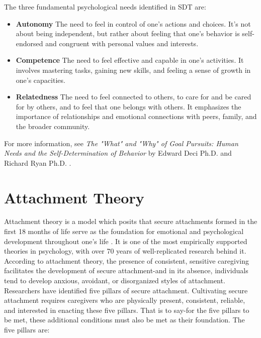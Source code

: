 \documentclass[12pt,letterpaper]{book}
\begin{document}
The three fundamental psychological needs identified in SDT are:
\begin{itemize}
    \item \textbf{Autonomy} The need to feel in control of one's actions and choices. It's not about being independent, but rather about feeling that one's behavior is self-endorsed and congruent with personal values and interests.
    \item \textbf{Competence} The need to feel effective and capable in one's activities. It involves mastering tasks, gaining new skills, and feeling a sense of growth in one's capacities.
    \item \textbf{Relatedness} The need to feel connected to others, to care for and be cared for by others, and to feel that one belongs with others. It emphasizes the importance of relationships and emotional connections with peers, family, and the broader community.
\end{itemize}
For more information, see \textit{The "What" and "Why" of Goal Pursuits: Human Needs and the Self-Determination of Behavior} by Edward Deci Ph.D. and Richard Ryan Ph.D. \cite{deciSDT}.
\chapter{Attachment Theory}
\label{attachment}
Attachment theory is a model which posits that secure attachments formed in the first 18 months of life serve as the foundation for emotional and psychological development throughout one's life \cite{brownAttachmentDisturbances}. It is one of the most empirically supported theories in psychology, with over 70 years of well-replicated research behind it. According to attachment theory, the presence of consistent, sensitive caregiving facilitates the development of secure attachment-and in its absence, individuals tend to develop anxious, avoidant, or disorganized styles of attachment. Researchers have identified five pillars of secure attachment. Cultivating secure attachment requires caregivers who are physically present, consistent, reliable, and interested in enacting these five pillars. That is to say-for the five pillars to be met, these additional conditions must also be met as their foundation. The five pillars are:
\end{document}
